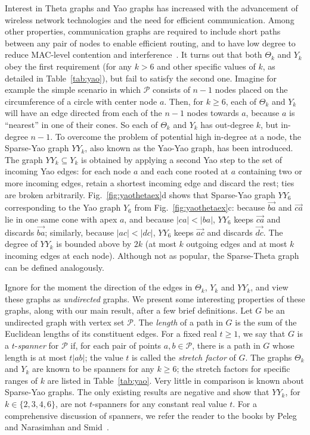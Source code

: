 \documentclass[11pt]{article}
\newcommand\Pt{\mathcal P}
\newcommand{\arr}[1]{\overrightarrow{#1}}
\begin{document}
Interest in Theta graphs and Yao graphs has increased with the advancement of wireless network technologies and the need for efficient communication. Among other properties, communication graphs are required to include short paths between any pair of nodes to enable efficient routing, and to have low degree to reduce MAC-level contention and interference~\cite{DegreeMac06}. It turns out that both $\Theta_k$ and $Y_k$ obey the first requirement (for any $k > 6$ and other specific values of $k$, as detailed in Table~\ref{tab:yao}), but fail to satisfy the second one. Imagine for example the simple scenario in which $\Pt$ consists of $n-1$ nodes placed on the circumference of a circle with center node $a$. Then, for $k \ge 6$, each of $\Theta_k$ and $Y_k$ will have an edge directed from each of the $n-1$ nodes towards $a$, because $a$ is ``nearest'' in one of their cones. So each of $\Theta_k$ and $Y_k$ has out-degree $k$, but in-degree $n-1$. To overcome the problem of potential high in-degree at a node, the Sparse-Yao graph $YY_k$, also known as the Yao-Yao graph, has been introduced. The graph $YY_k \subseteq Y_k$ is obtained by applying a second Yao step to the set of incoming Yao edges: for each node $a$ and each cone rooted at $a$ containing two or more incoming edges, retain a shortest incoming edge and discard the rest; ties are broken arbitrarily. Fig.~\ref{fig:yaothetaex}d shows that Sparse-Yao graph $YY_6$ corresponding to the Yao graph $Y_6$ from Fig.~\ref{fig:yaothetaex}c: because $\arr{ba}$ and $\arr{ca}$ lie in one same cone with apex $a$, and because $|ca| < |ba|$, $YY_6$ keeps $\arr{ca}$ and discards $\arr{ba}$; similarly, because $|ac| < |dc|$, $YY_6$ keeps $\arr{ac}$ and discards $\arr{dc}$.
The degree of $YY_k$ is bounded above by $2k$ (at most $k$ outgoing edges and at most $k$ incoming edges at each node). Although not as popular, the Sparse-Theta graph can be defined analogously.

Ignore for the moment the direction of the edges in $\Theta_k$, $Y_k$ and $YY_k$, and view these graphs as \emph{undirected} graphs.
We present some interesting properties of these graphs, along with our main result, after a few brief definitions. Let $G$ be an undirected graph with vertex set $\Pt$. The \emph{length} of a path in $G$ is the sum of the Euclidean lengths of its constituent edges. For a fixed real $t \ge 1$, we say that $G$ is a $t$-\emph{spanner} for $\Pt$ if, for each pair of points $a, b \in \Pt$, there is a path in $G$ whose length is at most $t|ab|$; the value $t$ is called the \emph{stretch factor} of $G$. The graphs $\Theta_k$ and $Y_k$ are known to be spanners for any $k \ge 6$; the stretch factors for specific ranges of $k$ are listed in Table~\ref{tab:yao}. Very little in comparison is known about Sparse-Yao graphs. The only existing results are negative and show that $YY_k$, for $k \in \{2,3,4,6\}$, are not $t$-spanners for any constant real value $t$. For a comprehensive discussion of spanners, we refer the reader to the books by Peleg~\cite{Peleg00} and Narasimhan and Smid~\cite{ns-gsn-07}.
\end{document}
